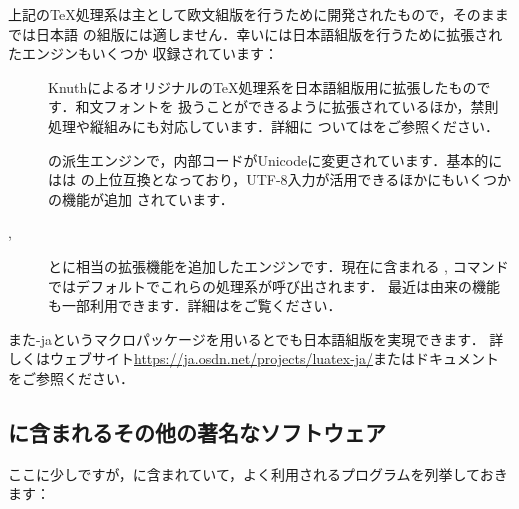 \documentclass[uplatex,dvipdfmx]{jsarticle}
\begin{document}
上記の\TeX 処理系は主として欧文組版を行うために開発されたもので，そのままでは日本語
の組版には適しません．幸い\TL には日本語組版を行うために拡張されたエンジンもいくつか
収録されています：
%
\begin{description}
\item[\pTeX]
Knuthによるオリジナルの\TeX 処理系を日本語組版用に拡張したものです．和文フォントを
扱うことができるように拡張されているほか，禁則処理や縦組みにも対応しています．詳細に
ついてはをご参照ください．

\item[\upTeX]
\pTeX の派生エンジンで，内部コードがUnicodeに変更されています．基本的には\upTeX は
\pTeX の上位互換となっており，UTF-8入力が活用できるほかにもいくつかの機能が追加
されています．

\item[\epTeX, \eupTeX]
\pTeX と\upTeX に\eTeX 相当の拡張機能を追加したエンジンです．現在\TL に含まれる
, コマンドではデフォルトでこれらの処理系が呼び出されます．
最近は\pdfTeX 由来の機能も一部利用できます．詳細はをご覧ください．
\end{description}

また\LuaTeX-jaというマクロパッケージを用いると\LuaTeX でも日本語組版を実現できます．
詳しくはウェブサイト\url{https://ja.osdn.net/projects/luatex-ja/}またはドキュメント
をご参照ください．

\subsection{\TL に含まれるその他の著名なソフトウェア}

ここに少しですが，\TL に含まれていて，よく利用されるプログラムを列挙しておきます：
\end{document}
